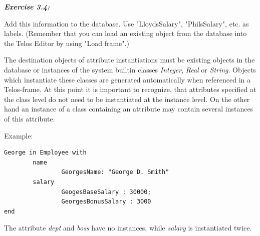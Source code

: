 \documentclass[10pt,a4paper]{article}
\begin{document}
\vspace{0.7cm}
{\it
{\bf Exercise 3.4:}


  Add this information to the database.
  Use "LloydsSalary", "PhilsSalary", etc. as labels.
  (Remember that you can load an existing object from the database into
  the Telos Editor by using "Load frame".)
\\
}

The destination objects of attribute instantiations must be existing objects in
the database or instances of the system builtin classes {\em Integer},
{\em Real} or {\em String}. Objects which instantiate these classes are
generated automatically when referenced in a Telos-frame.
At this point it is important to recognize, that attributes specified at the
class level do not need to be instantiated at the instance level. On the other
hand an instance of a class containing an attribute may contain several
instances of this attribute.

Example:\\
\begin{verbatim}
George in Employee with
        name
                GeorgesName: "George D. Smith"
        salary
                GeogesBaseSalary : 30000;
                GeorgesBonusSalary : 3000
end
\end{verbatim}


The attribute {\em dept} and {\em boss} have no instances, while
{\em salary} is instantiated twice.
\end{document}
